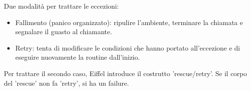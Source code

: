 \documentclass[a4paper,12pt,titlepage,oneside]{book}
\begin{document}
    Due modalità per trattare le eccezioni:
\begin{itemize}
    \item Fallimento (panico organizzato): ripulire l'ambiente, terminare la chiamata e segnalare il guasto al chiamante.
    \item Retry: tenta di modificare le condizioni che hanno portato all'eccezione e di eseguire nuovamente la routine dall'inizio.
\end{itemize}
    Per trattare il secondo caso, Eiffel introduce il costrutto 'rescue/retry'. Se il corpo del 'rescue' non fa 'retry', si ha un failure.
\end{document}
